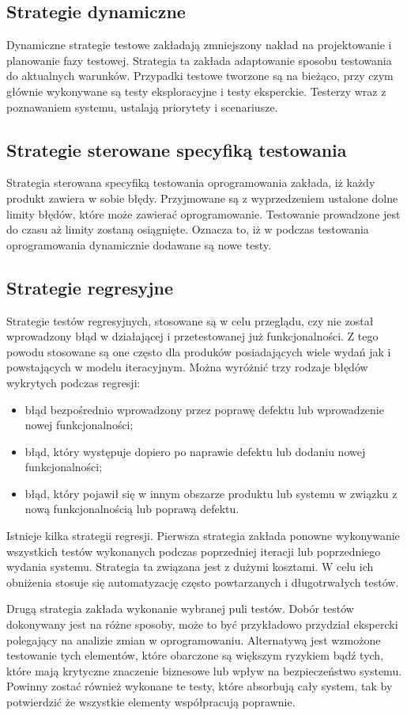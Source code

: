 \subsection{Strategie dynamiczne}
Dynamiczne strategie testowe zakładają zmniejszony nakład na projektowanie i planowanie fazy testowej. Strategia ta zakłada adaptowanie sposobu testowania do aktualnych warunków. Przypadki testowe tworzone są na bieżąco, przy czym głównie wykonywane są testy eksploracyjne i testy eksperckie. Testerzy wraz z poznawaniem systemu, ustalają priorytety i scenariusze.
\subsection{Strategie sterowane specyfiką testowania}
Strategia sterowana specyfiką testowania oprogramowania zakłada, iż każdy produkt zawiera w sobie błędy. Przyjmowane są z wyprzedzeniem ustalone dolne limity błędów, które może zawierać oprogramowanie. Testowanie prowadzone jest do czasu aż limity zostaną osiągnięte. Oznacza to, iż w podczas testowania oprogramowania dynamicznie dodawane są nowe testy.
\subsection{Strategie regresyjne}
Strategie testów regresyjnych, stosowane są w celu przeglądu, czy nie został wprowadzony błąd w działającej i przetestowanej już funkcjonalności. Z tego powodu stosowane są one często dla produków posiadających wiele wydań jak i powstających w modelu iteracyjnym. Można wyróżnić trzy rodzaje błędów wykrytych podczas regresji:
\begin{itemize}
  \item błąd bezpośrednio wprowadzony przez poprawę defektu lub wprowadzenie nowej funkcjonalności;
  \item błąd, który występuje dopiero po naprawie defektu lub dodaniu nowej funkcjonalności;
  \item  błąd, który pojawił się w innym obszarze produktu lub systemu w związku z nową funkcjonalnością lub poprawą defektu.
\end{itemize}


Istnieje kilka strategii regresji. Pierwsza strategia zakłada ponowne wykonywanie wszystkich testów wykonanych podczas poprzedniej iteracji lub poprzedniego wydania systemu. Strategia ta związana jest z dużymi kosztami. W celu ich obniżenia stosuje się automatyzację często powtarzanych i długotrwałych testów. 

Drugą strategia zakłada wykonanie wybranej puli testów. Dobór testów dokonywany jest na różne sposoby, może to być przykładowo przydział ekspercki polegający na analizie zmian w oprogramowaniu. Alternatywą jest wzmożone testowanie tych elementów, które obarczone są większym ryzykiem bądź tych, które mają krytyczne znaczenie biznesowe lub wpływ na bezpieczeństwo systemu. Powinny zostać również wykonane te testy, które absorbują cały system, tak by potwierdzić że wszystkie elementy współpracują poprawnie.

